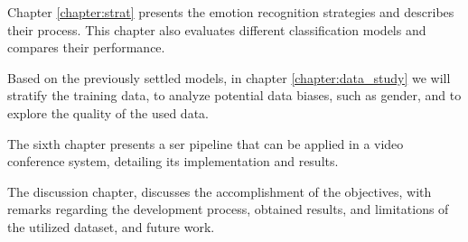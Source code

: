 Chapter \ref{chapter:strat} presents the emotion recognition strategies and describes their process. This chapter also evaluates different classification models and compares their performance.

Based on the previously settled models, in chapter \ref{chapter:data_study} we will stratify the training data, to analyze potential data biases, such as gender, and to explore the quality of the used data.

The sixth chapter presents a \ac{ser} pipeline that can be applied in a video conference system, detailing its implementation and results.

The discussion chapter, discusses the accomplishment of the objectives, with remarks regarding the development process, obtained results, and limitations of the utilized dataset, and future work.
